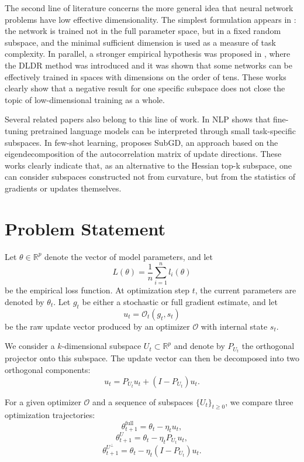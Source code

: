 \documentclass[conference]{IEEEtran}
\begin{document}
The second line of literature concerns the more general idea that neural network problems have low effective dimensionality. The simplest formulation appears in \citet{LiMeasuring}: the network is trained not in the full parameter space, but in a fixed random subspace, and the minimal sufficient dimension is used as a measure of task complexity. In parallel, a stronger empirical hypothesis was proposed in \citet{LiDLDR}, where the DLDR method was introduced and it was shown that some networks can be effectively trained in spaces with dimensions on the order of tens. These works clearly show that a negative result for one specific subspace does not close the topic of low-dimensional training as a whole.

Several related papers also belong to this line of work. In NLP \citet{ZhangFineTuning} shows that fine-tuning pretrained language models can be interpreted through small task-specific subspaces. In few-shot learning, \citet{GauchFewShot} proposes SubGD, an approach based on the eigendecomposition of the autocorrelation matrix of update directions. These works clearly indicate that, as an alternative to the Hessian top-k subspace, one can consider subspaces constructed not from curvature, but from the statistics of gradients or updates themselves.

\section{Problem Statement}

Let $\theta \in \mathbb{R}^p$ denote the vector of model parameters, and let
\[
L(\theta) = \frac{1}{n}\sum_{i=1}^n l_i(\theta)
\]
be the empirical loss function. At optimization step $t$, the current parameters are denoted by $\theta_t$. Let $g_t$ be either a stochastic or full gradient estimate, and let
\[
u_t = \mathcal{O}_t(g_t, s_t)
\]
be the raw update vector produced by an optimizer $\mathcal{O}$ with internal state $s_t$.

We consider a $k$-dimensional subspace $U_t \subset \mathbb{R}^p$ and denote by $P_{U_t}$ the orthogonal projector onto this subspace. The update vector can then be decomposed into two orthogonal components:
\[
u_t = P_{U_t}u_t + (I - P_{U_t})u_t.
\]

For a given optimizer $\mathcal{O}$ and a sequence of subspaces $\{U_t\}_{t \geq 0}$, we compare three optimization trajectories:
\[
\theta_{t+1}^{\mathrm{full}} = \theta_t - \eta_t u_t,
\]
\[
\theta_{t+1}^{U} = \theta_t - \eta_t P_{U_t}u_t,
\]
\[
\theta_{t+1}^{U^\perp} = \theta_t - \eta_t (I - P_{U_t})u_t.
\]
\end{document}
